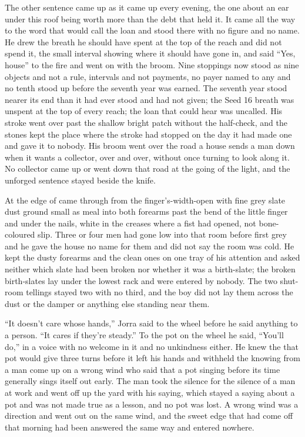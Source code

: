The other sentence came up as it came up every evening, the one about an ear under this roof being worth more than the debt that held it. It came all the way to the word that would call the loan and stood there with no figure and no name. He drew the breath he should have spent at the top of the reach and did not spend it, the small interval showing where it should have gone in, and said “Yes, house” to the fire and went on with the broom. Nine stoppings now stood as nine objects and not a rule, intervals and not payments, no payer named to any and no tenth stood up before the seventh year was earned. The seventh year stood nearer its end than it had ever stood and had not given; the Seed 16 breath was unspent at the top of every reach; the loan that could hear was uncalled. His stroke went over  past the shallow bright patch without the half-check, and the stones kept the place where the stroke had stopped on the day it had made one and gave it to nobody. His broom went over the road a house sends a man down when it wants a collector, over and over, without once turning to look along it. No collector came up or went down that road at the going of the light, and the unforged sentence stayed beside the knife.

\scenebreak

At the edge of   came through from the finger's-width-open  with fine grey slate dust ground small as meal into both forearms past the bend of the little finger and under the nails, white in the creases where a fist had opened, not bone-coloured slip. Three or four men had gone low into that room before first grey and he gave the house no name for them and did not say the room was cold. He kept the dusty forearms and the clean ones on one tray of his attention and asked neither which slate had been broken nor whether it was a birth-slate; the broken birth-slates lay under the lowest rack and were entered by nobody. The two shut-room tellings stayed two with no third, and the boy did not lay them across the dust or the damper or anything else standing near them.

“It doesn't care whose hands,” Jorra said to the wheel before he said anything to a person. “It cares if they're steady.” To the pot on the wheel he said, “You'll do,” in a voice with no welcome in it and no unkindness either. He knew the  that pot would give three turns before it left his hands and withheld the knowing from a man come up on a wrong wind who said that a pot singing before its time generally sings itself out early. The man took the silence for the silence of a man at work and went off up the yard with his saying, which stayed a saying about a pot and was not made true as a lesson, and no pot was lost. A wrong wind was a direction and went out on the same wind, and the sweet edge that had come off  that morning had been answered the same way and entered nowhere.

